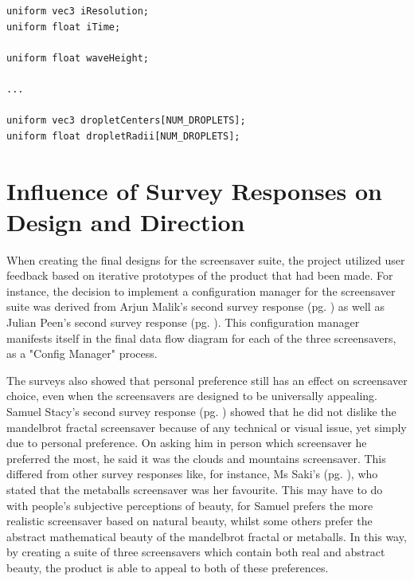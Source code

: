 \documentclass[10pt, openany]{book}
\begin{document}
\begin{verbatim}
uniform vec3 iResolution;
uniform float iTime;

uniform float waveHeight;

...

uniform vec3 dropletCenters[NUM_DROPLETS];
uniform float dropletRadii[NUM_DROPLETS];
\end{verbatim}

\section{Influence of Survey Responses on Design and Direction}
When creating the final designs for the screensaver suite, the project utilized user feedback based on iterative prototypes of the product that had been made. For instance, the decision to implement a configuration manager for the screensaver suite was derived from Arjun Malik's second survey response (pg. \pageref{app:survey-arjun-2}) as well as Julian Peen's second survey response (pg. \pageref{app:survey-julian-2}). This configuration manager manifests itself in the final data flow diagram for each of the three screensavers, as a "Config Manager" process.

The surveys also showed that personal preference still has an effect on screensaver choice, even when the screensavers are designed to be universally appealing. Samuel Stacy's second survey response (pg. \pageref{app:survey-sam-2}) showed that he did not dislike the mandelbrot fractal screensaver because of any technical or visual issue, yet simply due to personal preference. On asking him in person which screensaver he preferred the most, he said it was the clouds and mountains screensaver. This differed from other survey responses like, for instance, Ms Saki's (pg. \pageref{app:survey-aartee}), who stated that the metaballs screensaver was her favourite. This may have to do with people's subjective perceptions of beauty, for Samuel prefers the more realistic screensaver based on natural beauty, whilst some others prefer the abstract mathematical beauty of the mandelbrot fractal or metaballs. In this way, by creating a suite of three screensavers which contain both real and abstract beauty, the product is able to appeal to both of these preferences.
\end{document}
